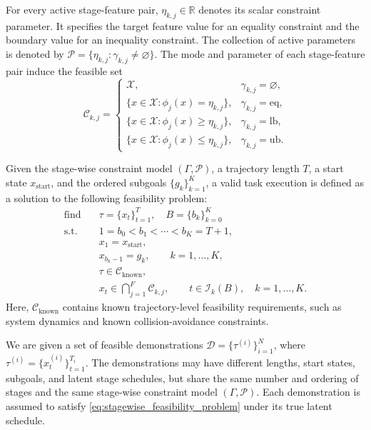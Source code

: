 \documentclass[lettersize,journal]{IEEEtran}
\begin{document}
For every active stage-feature pair, $\eta_{k,j}\in\mathbb{R}$ denotes its scalar constraint parameter. It specifies the target feature value for an equality constraint and the boundary value for an inequality constraint. The collection of active parameters is denoted by $\mathcal{P}=\{\eta_{k,j}:\gamma_{k,j}\neq\varnothing\}$. The mode and parameter of each stage-feature pair induce the feasible set
\begin{equation}
\mathcal{C}_{k,j}
=
\begin{cases}
\mathcal{X},
& \gamma_{k,j}=\varnothing,\\
\{x\in\mathcal{X}:\phi_j(x)=\eta_{k,j}\},
& \gamma_{k,j}=\mathrm{eq},\\
\{x\in\mathcal{X}:\phi_j(x)\geq\eta_{k,j}\},
& \gamma_{k,j}=\mathrm{lb},\\
\{x\in\mathcal{X}:\phi_j(x)\leq\eta_{k,j}\},
& \gamma_{k,j}=\mathrm{ub}.
\end{cases}
\label{eq:stage_feature_feasible_set}
\end{equation}

Given the stage-wise constraint model $(\Gamma,\mathcal{P})$, a trajectory length $T$, a start state $x_{\mathrm{start}}$, and the ordered subgoals $\{g_k\}_{k=1}^{K}$, a valid task execution is defined as a solution to the following feasibility problem:
\begin{equation}
\begin{aligned}
\text{find}\quad
& \tau=\{x_t\}_{t=1}^{T},\quad B=\{b_k\}_{k=0}^{K} \\
\text{s.t.}\quad
& 1=b_0<b_1<\cdots<b_K=T+1,\\
& x_1=x_{\mathrm{start}},\\
& x_{b_k-1}=g_k,
\qquad k=1,\dots,K,\\
& \tau\in\mathcal{C}_{\mathrm{known}},\\
& x_t\in\bigcap_{j=1}^{F}\mathcal{C}_{k,j},
\qquad
t\in\mathcal{I}_k(B),\quad k=1,\dots,K.
\end{aligned}
\label{eq:stagewise_feasibility_problem}
\end{equation}
Here, $\mathcal{C}_{\mathrm{known}}$ contains known trajectory-level feasibility requirements, such as system dynamics and known collision-avoidance constraints.

We are given a set of feasible demonstrations $\mathcal{D}=\{\tau^{(i)}\}_{i=1}^{N}$, where $\tau^{(i)}=\{x_t^{(i)}\}_{t=1}^{T_i}$. The demonstrations may have different lengths, start states, subgoals, and latent stage schedules, but share the same number and ordering of stages and the same stage-wise constraint model $(\Gamma,\mathcal{P})$. Each demonstration is assumed to satisfy \eqref{eq:stagewise_feasibility_problem} under its true latent schedule.
\end{document}
